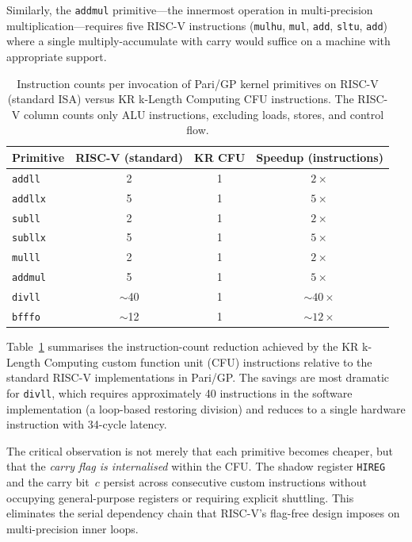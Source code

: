 \documentclass[11pt,a4paper]{article}
\begin{document}
Similarly, the \texttt{addmul} primitive---the innermost operation in
multi-precision multiplication---requires five RISC-V instructions
(\texttt{mulhu}, \texttt{mul}, \texttt{add}, \texttt{sltu}, \texttt{add})
where a single multiply-accumulate with carry would suffice on a machine
with appropriate support.

\begin{table}[t]
\centering
\caption{Instruction counts per invocation of Pari/GP kernel primitives on
  RISC-V (standard ISA) versus KR k-Length Computing CFU instructions.  The
  RISC-V column counts only ALU instructions, excluding loads, stores, and
  control flow.}
\label{tab:insn-count}
\begin{tabular}{@{}lccc@{}}
\toprule
Primitive & RISC-V (standard) & KR CFU & Speedup (instructions) \\
\midrule
\texttt{addll}  & 2 & 1 & $2\times$ \\
\texttt{addllx} & 5 & 1 & $5\times$ \\
\texttt{subll}  & 2 & 1 & $2\times$ \\
\texttt{subllx} & 5 & 1 & $5\times$ \\
\texttt{mulll}  & 2 & 1 & $2\times$ \\
\texttt{addmul} & 5 & 1 & $5\times$ \\
\texttt{divll}  & $\sim$40 & 1 & $\sim$$40\times$ \\
\texttt{bfffo}  & $\sim$12 & 1 & $\sim$$12\times$ \\
\bottomrule
\end{tabular}
\end{table}

Table~\ref{tab:insn-count} summarises the instruction-count reduction
achieved by the KR k-Length Computing custom function unit (CFU) instructions
relative to the standard RISC-V implementations in Pari/GP.  The savings are
most dramatic for \texttt{divll}, which requires approximately 40 instructions
in the software implementation (a loop-based restoring division) and reduces to
a single hardware instruction with 34-cycle latency.

The critical observation is not merely that each primitive becomes cheaper, but
that the \emph{carry flag is internalised} within the CFU.  The shadow register
\texttt{HIREG} and the carry bit~$c$ persist across consecutive custom
instructions without occupying general-purpose registers or requiring explicit
shuttling.  This eliminates the serial dependency chain that RISC-V's
flag-free design imposes on multi-precision inner loops.
\end{document}
